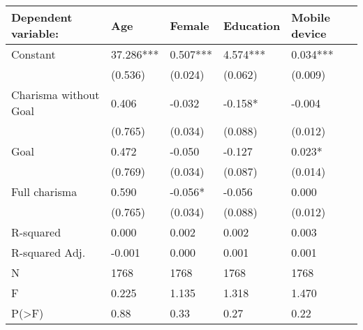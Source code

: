 \begin{tabular}{lllll}
\toprule
Dependent variable: &        Age &    Female & Education & Mobile device \\
\midrule
Constant              &  37.286*** &  0.507*** &  4.574*** &      0.034*** \\
                      &    (0.536) &   (0.024) &   (0.062) &       (0.009) \\
Charisma without Goal &      0.406 &    -0.032 &   -0.158* &        -0.004 \\
                      &    (0.765) &   (0.034) &   (0.088) &       (0.012) \\
Goal                  &      0.472 &    -0.050 &    -0.127 &        0.023* \\
                      &    (0.769) &   (0.034) &   (0.087) &       (0.014) \\
Full charisma         &      0.590 &   -0.056* &    -0.056 &         0.000 \\
                      &    (0.765) &   (0.034) &   (0.088) &       (0.012) \\
R-squared             &      0.000 &     0.002 &     0.002 &         0.003 \\
R-squared Adj.        &     -0.001 &     0.000 &     0.001 &         0.001 \\
N                     &       1768 &      1768 &      1768 &          1768 \\
F                     &      0.225 &     1.135 &     1.318 &         1.470 \\
P(>F)                 &       0.88 &      0.33 &      0.27 &          0.22 \\
\bottomrule
\end{tabular}
